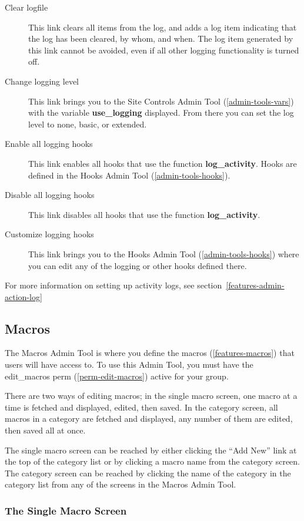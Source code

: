 \begin{description}
\item[Clear logfile] This link clears all items from the log, and adds a log item indicating that the log has been cleared, by whom, and when. The log item generated by this link cannot be avoided, even if all other logging functionality is turned off.
\item[Change logging level] This link brings you to the Site Controls Admin Tool (\ref{admin-tools-vars}) with the variable {\bf use\_logging} displayed. From there you can set the log level to none, basic, or extended.
\item[Enable all logging hooks] This link enables all hooks that use the function {\bf log\_activity}. Hooks are defined in the Hooks Admin Tool (\ref{admin-tools-hooks}).
\item[Disable all logging hooks] This link disables all hooks that use the function {\bf log\_activity}.
\item[Customize logging hooks] This link brings you to the Hooks Admin Tool (\ref{admin-tools-hooks}) where you can edit any of the logging or other hooks defined there.
\end{description}

For more information on setting up activity logs, see section~\ref{features-admin-action-log}

\subsection{Macros}
\label{admin-tools-macros}

The Macros Admin Tool is where you define the macros (\ref{features-macros}) that users will have access to.  To use this Admin Tool, you must have the edit\_macros perm (\ref{perm-edit-macros}) active for your group.

There are two ways of editing macros; in the single macro screen, one macro at a time is fetched and displayed, edited, then saved.  In the category screen, all macros in a category are fetched and displayed, any number of them are edited, then saved all at once.

The single macro screen can be reached by either clicking the ``Add New'' link at the top of the category list or by clicking a macro name from the category screen.  The category screen can be reached by clicking the name of the category in the category list from any of the screens in the Macros Admin Tool.

\subsubsection{The Single Macro Screen}

